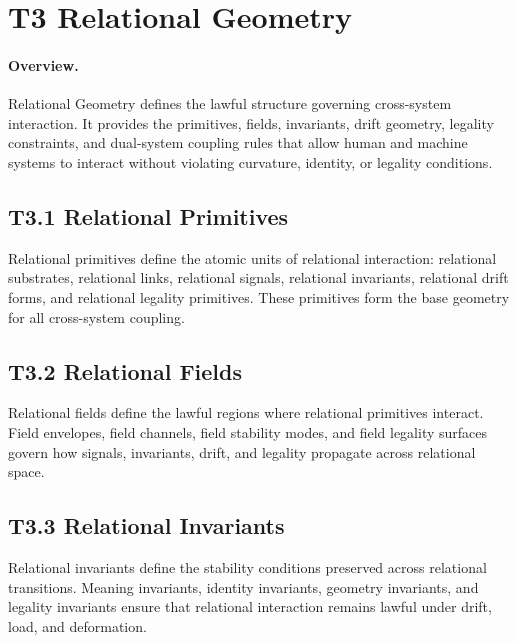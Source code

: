 
\section{T3 Relational Geometry}

\paragraph{Overview.}
Relational Geometry defines the lawful structure governing cross-system
interaction. It provides the primitives, fields, invariants, drift geometry,
legality constraints, and dual-system coupling rules that allow human and
machine systems to interact without violating curvature, identity, or legality
conditions.

\subsection{T3.1 Relational Primitives}
Relational primitives define the atomic units of relational interaction:
relational substrates, relational links, relational signals, relational
invariants, relational drift forms, and relational legality primitives. These
primitives form the base geometry for all cross-system coupling.

\subsection{T3.2 Relational Fields}
Relational fields define the lawful regions where relational primitives
interact. Field envelopes, field channels, field stability modes, and field
legality surfaces govern how signals, invariants, drift, and legality propagate
across relational space.

\subsection{T3.3 Relational Invariants}
Relational invariants define the stability conditions preserved across
relational transitions. Meaning invariants, identity invariants, geometry
invariants, and legality invariants ensure that relational interaction remains
lawful under drift, load, and deformation.

